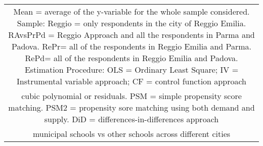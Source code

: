 \documentclass[]{article}
\begin{document}
\begin{tabular}{lcccccccccc}
\multicolumn{11}{c}{ Mean = average of the y-variable for the whole sample considered. Sample: Reggio = only respondents in the city of Reggio Emilia. RAvsPrPd = Reggio Approach and all the respondents in Parma and Padova. RePr= all of the respondents in Reggio Emilia and Parma. RePd= all of the respondents in Reggio Emilia and Padova. Estimation Procedure: OLS = Ordinary Least Square; IV = Instrumental variable approach; CF = control function approach} \\
\multicolumn{11}{c}{ cubic polynomial or residuals. PSM = simple propensity score matching. PSM2 = propensity sore matching using both demand and supply. DiD = differences-in-differences approach} \\
\multicolumn{11}{c}{ municipal schools vs other schools across different cities} \\
\end{tabular}
\end{document}
